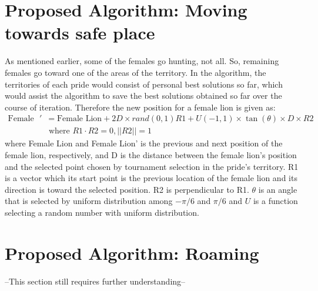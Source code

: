\section{Proposed Algorithm: Moving towards safe place}

As mentioned earlier, some of the females go hunting, not all. So, remaining females go toward one of the areas of the territory. In the algorithm, the territories of each pride would consist of personal best solutions so far, which would assist the algorithm to save the best solutions obtained so far over the course of iteration.
Therefore the new position for a female lion is given as:
\begin{align*}
\text{Female Lion}' &= \text{Female Lion} + 2D \times rand(0,1){R1} + U(-1,1) \times \tan(\theta) \times D \times {R2} \\
&\text{  where } R1 \cdot R2 = 0, ||R2|| = 1
\end{align*}
where Female Lion and Female Lion' is the previous and next position of the female lion, respectively, and D is the distance between the female lion's position and the selected point chosen by tournament selection in the pride's territory.
{R1} is a vector which its start point is the previous location of the female lion and its direction is toward the selected position. {R2} is perpendicular to {R1}. $\theta$ is an angle that is selected by uniform distribution among $-\pi/6$ and $\pi/6$ and $U$ is a function selecting a random number with uniform distribution.


\section{Proposed Algorithm: Roaming}

--This section still requires further understanding--
